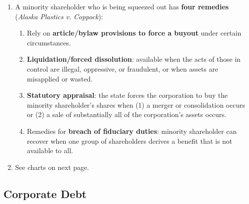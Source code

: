 \begin{enumerate}
\begin{enumerate}
        \item A minority shareholder who is being squeezed out has 
        \textbf{four remedies} (\emph{Alaska Plastics v. Coppock}):
        \begin{enumerate}
            \item Rely on \textbf{article/bylaw provisions to force a buyout} 
            under certain circumstances.
            \item \textbf{Liquidation/forced dissolution}: available when the 
            acts of those in control are illegal, oppressive, or fraudulent, 
            or when assets are misapplied or wasted.
            \item \textbf{Statutory appraisal}: the state forces the 
            corporation to buy the minority shareholder's shares when (1) a 
            merger or consolidation occurs or (2) a sale of substantially all 
            of the corporation's assets occurs.
            \item Remedies for \textbf{breach of fiduciary duties}: minority 
            shareholder can recover when one group of shareholders derives a 
            benefit that is not available to all.
        \end{enumerate}
        \item See charts on next page.
    \end{enumerate}
\end{enumerate}



\newpage

\subsection{Corporate Debt}

